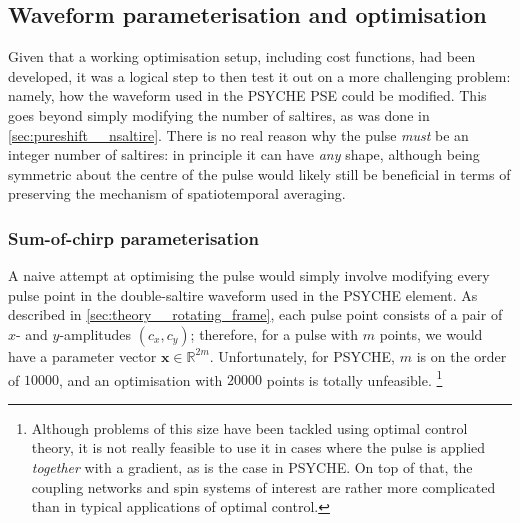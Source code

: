 \subsection{Waveform parameterisation and optimisation}
\label{subsec:pureshift__chirpopt}

Given that a working optimisation setup, including cost functions, had been developed, it was a logical step to then test it out on a more challenging problem: namely, how the waveform used in the PSYCHE PSE could be modified.
This goes beyond simply modifying the number of saltires, as was done in \cref{sec:pureshift__nsaltire}.
There is no real reason why the pulse \textit{must} be an integer number of saltires: in principle it can have \textit{any} shape, although being symmetric about the centre of the pulse would likely still be beneficial in terms of preserving the mechanism of spatiotemporal averaging.


\subsubsection{Sum-of-chirp parameterisation}

A naive attempt at optimising the pulse would simply involve modifying every pulse point in the double-saltire waveform used in the PSYCHE element.
As described in \cref{sec:theory__rotating_frame}, each pulse point consists of a pair of $x$- and $y$-amplitudes $(c_x, c_y)$; therefore, for a pulse with $m$ points, we would have a parameter vector $\symbf{x} \in \mathbb{R}^{2m}$.
Unfortunately, for PSYCHE, $m$ is on the order of $10000$, and an optimisation with $20000$ points is totally unfeasible.%
\footnote{Although problems of this size have been tackled using optimal control theory\autocite{Khaneja2005JMR,deFouquieres2011JMR,Glaser2015EPJD,Goodwin2016JCP}, it is not really feasible to use it in cases where the pulse is applied \textit{together} with a gradient, as is the case in PSYCHE. On top of that, the coupling networks and spin systems of interest are rather more complicated than in typical applications of optimal control.}

